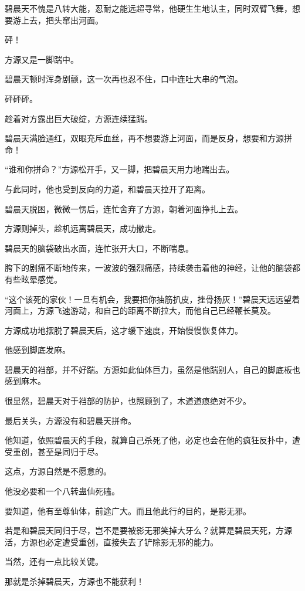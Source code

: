 \begin{this_body}
碧晨天不愧是八转大能，忍耐之能远超寻常，他硬生生地认主，同时双臂飞舞，想要游上去，把头窜出河面。

砰！

方源又是一脚踹中。

碧晨天顿时浑身剧颤，这一次再也忍不住，口中连吐大串的气泡。

砰砰砰。

趁着对方露出巨大破绽，方源连续猛踹。

碧晨天满脸通红，双眼充斥血丝，再不想要游上河面，而是反身，想要和方源拼命！

“谁和你拼命？”方源松开手，又一脚，把碧晨天用力地踹出去。

与此同时，他也受到反向的力道，和碧晨天拉开了距离。

碧晨天脱困，微微一愣后，连忙舍弃了方源，朝着河面挣扎上去。

方源则掉头，趁机远离碧晨天，成功撤走。

碧晨天的脑袋破出水面，连忙张开大口，不断喘息。

胯下的剧痛不断地传来，一波波的强烈痛感，持续袭击着他的神经，让他的脑袋都有些眩晕感觉。

“这个该死的家伙！一旦有机会，我要把你抽筋扒皮，挫骨扬灰！”碧晨天远远望着河面上，方源飞速游动，和自己的距离不断拉大，而他自己已经鞭长莫及。

方源成功地摆脱了碧晨天后，这才缓下速度，开始慢慢恢复体力。

他感到脚底发麻。

碧晨天的裆部，并不好踹。方源如此仙体巨力，虽然是他踹别人，自己的脚底板也感到麻木。

很显然，碧晨天对于裆部的防护，也照顾到了，木道道痕绝对不少。

最后关头，方源没有和碧晨天拼命。

他知道，依照碧晨天的手段，就算自己杀死了他，必定也会在他的疯狂反扑中，遭受重创，甚至是同归于尽。

这点，方源自然是不愿意的。

他没必要和一个八转蛊仙死磕。

要知道，他有至尊仙体，前途广大。而且他此行的目的，是影无邪。

若是和碧晨天同归于尽，岂不是要被影无邪笑掉大牙么？就算是碧晨天死，方源活，方源也必定遭受重创，直接失去了铲除影无邪的能力。

当然，还有一点比较关键。

那就是杀掉碧晨天，方源也不能获利！


\end{this_body}

